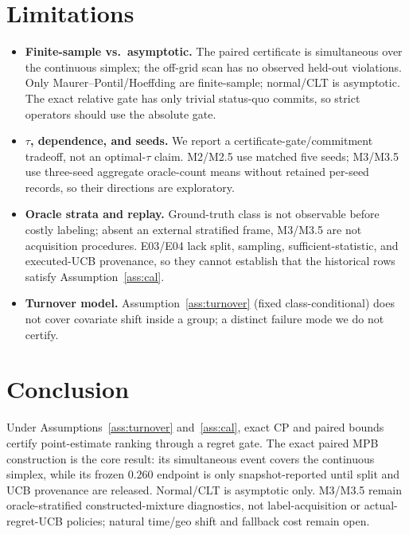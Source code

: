\documentclass{article}
\begin{document}
\section{Limitations}
\label{sec:limits}
\begin{itemize}
\item \textbf{Finite-sample vs.\ asymptotic.} The paired certificate is simultaneous over the
continuous simplex; the off-grid scan has no observed held-out violations. Only Maurer--Pontil/Hoeffding
are finite-sample; normal/CLT is asymptotic. The exact relative gate has only trivial
status-quo commits, so strict operators should use the absolute gate.
\item \textbf{$\tau$, dependence, and seeds.} We report a certificate-gate/commitment
tradeoff, not an optimal-$\tau$ claim. M2/M2.5 use matched five seeds; M3/M3.5 use three-seed
aggregate oracle-count means without retained per-seed records, so their directions are exploratory.
\item \textbf{Oracle strata and replay.} Ground-truth class is not observable before costly
labeling; absent an external stratified frame, M3/M3.5 are not acquisition procedures. E03/E04
lack split, sampling, sufficient-statistic, and executed-UCB provenance, so they cannot establish
that the historical rows satisfy Assumption~\ref{ass:cal}.
\item \textbf{Turnover model.} Assumption~\ref{ass:turnover} (fixed class-conditional) does
not cover covariate shift inside a group; a distinct failure mode we do not certify.
\end{itemize}

\section{Conclusion}
\label{sec:concl}
Under Assumptions~\ref{ass:turnover} and~\ref{ass:cal}, exact CP and paired bounds certify
point-estimate ranking through a regret gate. The exact paired MPB construction is the core
result: its simultaneous event covers the continuous simplex, while its frozen $0.260$ endpoint
is only snapshot-reported until split and UCB provenance are released. Normal/CLT is asymptotic
only. M3/M3.5 remain oracle-stratified constructed-mixture diagnostics, not label-acquisition
or actual-regret-UCB policies; natural time/geo shift and fallback cost remain open.




\clearpage
\appendix
\end{document}
